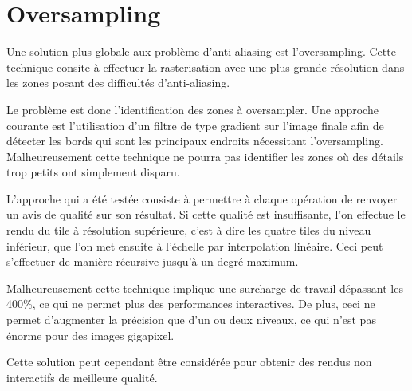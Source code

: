 		\section{Oversampling}
			Une solution plus globale aux problème d'anti-aliasing est l'oversampling. Cette
			technique consite à effectuer la rasterisation avec une plus grande résolution dans les zones
			posant des difficultés d'anti-aliasing. 

			Le problème est donc l'identification des zones à oversampler. Une approche courante est l'utilisation
			d'un filtre de type gradient sur l'image finale afin de détecter les bords qui sont les principaux 
			endroits nécessitant l'oversampling. Malheureusement cette technique ne pourra pas identifier les zones
			où des détails trop petits ont simplement disparu.

			L'approche qui a été testée consiste à permettre à chaque opération de renvoyer un avis de qualité sur
			son résultat. Si cette qualité est insuffisante, l'on effectue le rendu
			du tile à résolution supérieure, c'est à dire les quatre tiles du niveau inférieur, que l'on met
			ensuite à l'échelle par interpolation linéaire. Ceci peut s'effectuer de manière récursive jusqu'à un degré
			maximum.

			Malheureusement cette technique implique une surcharge de travail dépassant les 400\%, ce qui ne permet plus
			des performances interactives. De plus, ceci ne permet d'augmenter la précision que d'un ou deux niveaux, ce
			qui n'est pas énorme pour des images gigapixel. 

			Cette solution peut cependant être considérée pour obtenir des rendus non interactifs de meilleure qualité.




